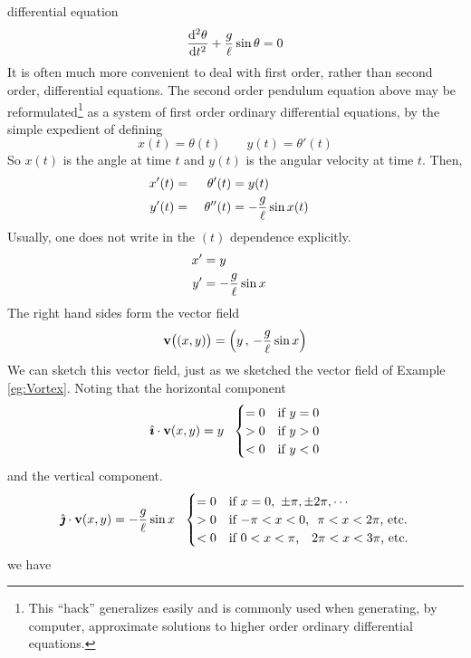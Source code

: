 \begin{eg}
differential equation
\begin{equation*}
\difftwo{\theta}{t} +\frac{g}{\ell}\sin\theta=0
\end{equation*}
It is often much more convenient to deal with first order, rather than
second order, differential equations.
The second order pendulum equation above may be 
reformulated\footnote{This ``hack'' generalizes easily and is 
commonly used when generating, by computer, approximate solutions to higher order ordinary differential equations.} 
as a system of first order ordinary differential equations, by the 
simple expedient of defining
\begin{equation*}
x(t)=\theta(t)\qquad y(t)=\theta'(t)
\end{equation*}
So $x(t)$ is the angle at time $t$ and $y(t)$ is the angular velocity at time $t$. Then, 
\begin{alignat*}{3}
x'(t)&=&\theta'(t)&=y(t)\cr
y'(t)&=&\ \theta''(t)&=-\frac{g}{\ell}\sin x(t)
\end{alignat*}
Usually, one does not write in the $(t)$ dependence explicitly.
\begin{align*}
x'&=y\cr
y'&=-\frac{g}{\ell}\sin x
\end{align*}
The right hand sides form the vector field
\begin{equation*}
\mathbf{v}\big((x,y)\big)=\Big(y\,,\,-\frac{g}{\ell}\sin x\Big)
\end{equation*}
We can sketch this vector field, just as we sketched the vector field 
of Example \ref{eg:Vortex}. Noting that the horizontal component
\begin{equation*}
\hi\cdot\vv(x,y)
= y\ \ 
\begin{cases}
   =0 &\text{if $y=0$}\\
   >0 &\text{if $y>0$}\\
   <0 &\text{if $y<0$}
\end{cases}
\end{equation*}
and the vertical component.
\begin{equation*}
\hj\cdot\vv(x,y)
= -\frac{g}{\ell}\sin x\ \ 
\begin{cases}
   =0 &\text{if $x=0,\ \pm\pi, \pm2\pi, \cdots$}\\
   >0 &\text{if $-\pi<x<0$,\ \  $\pi<x<2\pi$, etc.}\\
   <0 &\text{if $0<x<\pi$, \ \ $2\pi<x<3\pi$, etc.}
\end{cases}
\end{equation*}
we have
\begin{itemize}\itemsep1pt \parskip0pt  %

\end{itemize}
\end{eg}
